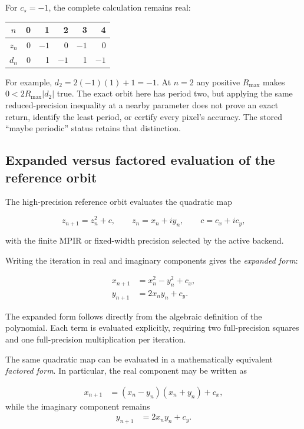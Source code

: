 For $c_\star=-1$, the complete calculation remains real:
\begin{center}
\begin{tabular}{c|rrrrr}
$n$ & 0 & 1 & 2 & 3 & 4 \\
\hline
$z_n$ & 0 & $-1$ & 0 & $-1$ & 0 \\
$d_n$ & 0 & 1 & $-1$ & 1 & $-1$
\end{tabular}
\end{center}
For example, $d_2=2(-1)(1)+1=-1$.  At $n=2$ any positive
$R_{\max}$ makes $0<2R_{\max}|d_2|$ true.  The exact orbit here has
period two, but applying the same reduced-precision inequality at a nearby
parameter does not prove an exact return, identify the least period, or
certify every pixel's accuracy.  The stored ``maybe periodic'' status retains
that distinction.

\subsection{Expanded versus factored evaluation of the reference orbit}
\label{subsec:ref-orbit-expanded-factored}

The high-precision reference orbit evaluates the quadratic map

\[
z_{n+1} = z_n^2 + c,
\qquad
z_n = x_n + i y_n,
\qquad
c = c_x + i c_y,
\]

with the finite MPIR or fixed-width  precision selected by
the active backend.

Writing the iteration in real and imaginary components gives the
\emph{expanded form}:

\begin{align}
x_{n+1} &= x_n^2 - y_n^2 + c_x, \label{eq:ref-expanded-real} \\
y_{n+1} &= 2 x_n y_n + c_y. \label{eq:ref-expanded-imag}
\end{align}

The expanded form follows directly from the algebraic definition of the polynomial.
Each term is evaluated explicitly, requiring two full-precision squares and
one full-precision multiplication per iteration.

The same quadratic map can be evaluated in a mathematically equivalent
\emph{factored form}. In particular, the real component may be written as

\begin{align}
x_{n+1}
&= (x_n - y_n)(x_n + y_n) + c_x, \label{eq:ref-factored-real}
\end{align}
while the imaginary component remains
\begin{align}
y_{n+1} &= 2 x_n y_n + c_y. \label{eq:ref-factored-imag}
\end{align}

